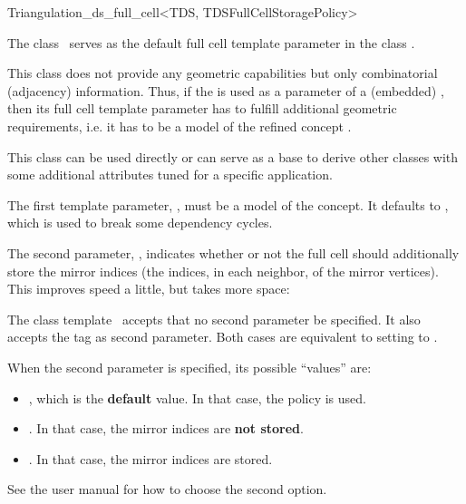 \begin{ccRefClass}{Triangulation_ds_full_cell<TDS, TDSFullCellStoragePolicy>}

\ccDefinition

The class \ccRefName\ serves as the default full cell template parameter in the
class .

This class does not provide any geometric capabilities but only combinatorial
(adjacency) information. Thus, if the  is
used as a parameter of a (embedded) , then its full cell template
parameter has to fulfill additional geometric requirements, i.e. it has to be
a model of the refined concept .

This class can be used directly or can serve as a base to derive other classes
with some additional attributes tuned for a specific application.


\ccParameters

The first template parameter, , must be a model of the
 concept. It defaults to , which is
used to break some dependency cycles.

The second parameter, , indicates whether or not
the full cell should additionally store the mirror indices (the indices, in each
neighbor, of the mirror vertices). This improves speed a little, but takes
more space:

The class template \ccRefName\ accepts that no second parameter be specified.
It also accepts the tag  as second parameter. Both cases are
equivalent to setting  to
.

When the second parameter is specified, its possible ``values''
are:\begin{itemize}

\item {}, which is the \textbf{default} value. In that case, the
policy  is used.

\item {}. In that case, the mirror
indices are \textbf{not stored}.

\item {}. In that case, the mirror
indices are stored.
\end{itemize}
See the user manual  for how to choose the second option.

\ccIsModel


\ccSeeAlso


\end{ccRefClass}
